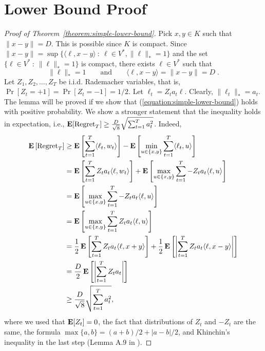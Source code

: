 \section{Lower Bound Proof}
\label{section:lower-bound-proof}

\begin{proof}[Proof of Theorem~\ref{theorem:simple-lower-bound}]
Pick $x,y \in K$ such that $\|x - y\| = D$. This is possible since $K$ is compact.
Since $\|x - y\| = \sup \{\langle \ell, x - y \rangle ~:~ \ell \in V^*, \|\ell\|_* = 1\}$
and the set $\{ \ell \in V^* ~:~ \|\ell\|_* = 1 \}$ is compact, there exists $\ell \in V^*$
such that
$$
\|\ell\|_* = 1 \qquad \text{and} \qquad \langle \ell, x - y \rangle = \|x - y\| = D \; .
$$
Let $Z_1, Z_2, \dots, Z_T$ be i.i.d. Rademacher variables, that is,
$\Pr[Z_t = +1] = \Pr[Z_t = -1] = 1/2$. Let $\ell_t = Z_t a_t \ell$.
Clearly, $\|\ell_t\|_* = a_t$. The lemma will be proved if we show that
(\ref{equation:simple-lower-bound}) holds with positive probability.
We show a stronger statement that the inequality holds in expectation, i.e.,
$\operatorname*{\mathbf{E}}[\operatorname{Regret}_T] \ge \frac{D}{\sqrt{8}} \sqrt{\sum_{t=1}^T a_t^2}$. Indeed,
\begin{align*}
\operatorname*{\mathbf{E}}\left[ \operatorname{Regret}_T \right]
& \ge \operatorname*{\mathbf{E}}\left[ \sum_{t=1}^T \langle \ell_t, w_t \rangle \right] - \operatorname*{\mathbf{E}}\left[\min_{u \in \{x,y\}} \sum_{t=1}^T \langle \ell_t, u \rangle \right] \\
& = \operatorname*{\mathbf{E}}\left[ \sum_{t=1}^T Z_t a_t \langle \ell, w_t \rangle \right] + \operatorname*{\mathbf{E}} \left[\max_{u \in \{x,y\}} \sum_{t=1}^T -Z_t a_t \langle \ell, u \rangle \right]  \\
& = \operatorname*{\mathbf{E}}\left[ \max_{u \in \{x,y\}} \sum_{t=1}^T -Z_t a_t \langle \ell, u \rangle \right] \\
& = \operatorname*{\mathbf{E}}\left[ \max_{u \in \{x,y\}} \sum_{t=1}^T Z_t a_t \langle \ell, u \rangle \right]  \\
& = \frac{1}{2} \operatorname*{\mathbf{E}}\left[ \sum_{t=1}^T Z_t a_t \langle \ell, x + y \rangle \right]  + \frac{1}{2}\operatorname*{\mathbf{E}}\left[ \left|\sum_{t=1}^T Z_t a_t \langle \ell, x - y \rangle \right| \right] \\
& = \frac{D}{2}\operatorname*{\mathbf{E}}\left[ \left|\sum_{t=1}^T Z_t a_t \right| \right] \\
& \ge \frac{D}{\sqrt{8}} \sqrt{\sum_{t=1}^T a_t^2},
\end{align*}
where we used that $\operatorname*{\mathbf{E}}[Z_t] = 0$, the fact that distributions of $Z_t$ and
$-Z_t$ are the same, the formula $\max\{a,b\} = (a+b)/2 + |a-b|/2$, and
Khinchin's inequality in the last step (Lemma A.9 in
\cite{Cesa-Bianchi-Lugosi-2006}).
\end{proof}
